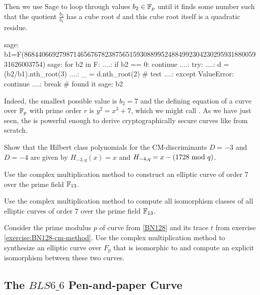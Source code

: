 \begin{example}
Then we use Sage to loop through values $b_2\in \mathbb{F}_p$ until it finds some number such that the quotient $\frac{b_2}{b_1}$ has a cube root $d$ and this cube root itself is a quadratic residue. 
\begin{sagecommandline}
sage: b1=F(86844066927987146567678238756515930889952488499230423029593188005931626003754)
sage: for b2 in F:
....:     if b2 == 0: continue
....:     try:
....:         d = (b2/b1).nth_root(3)
....:         _ = d.nth_root(2) # test
....:     except ValueError: continue
....:     break # found it
sage: b2
\end{sagecommandline}
Indeed, the smallest possible value is $b_2=7$ and the defining  equation of a curve over $\mathbb{F}_p$ with prime order $r$ is 
$
y^2 = x^3 + 7
$,
which we might call . As we have just seen, the  is powerful enough to derive cryptographically secure curves like  from scratch.
\end{example}
\begin{exercise}
\label{ex:Low_order_Hilbert_polys} Show that the Hilbert class polynomials for the CM-discriminants $D=-3$ and $D=-4$ are given by  $H_{-3,q}(x)=x$ and $H_{-4,q}= x-(1728 \text{ mod } q)$.
\end{exercise}
\begin{exercise}
Use the complex multiplication method to construct an elliptic curve of order $7$ over the prime field $\mathbb{F}_{13}$.
\end{exercise}
\begin{exercise}
Use the complex multiplication method to compute all isomorphism classes of all elliptic curves of order $7$ over the prime field $\mathbb{F}_{13}$.
\end{exercise}
\begin{exercise}
\label{exercise:BN128-cm-method}
Consider the prime modulus $p$ of curve  from \examplename{} \ref{BN128} and its trace $t$ from exercise \ref{exercise:BN128-cm-method}. Use the complex multiplication method to synthesize an elliptic curve over $F_p$ that is isomorphic to  and compute an explicit isomorphism between these two curves.
\end{exercise}
\subsection{The $BLS6\_6$ Pen-and-paper Curve}\label{BLS6}

